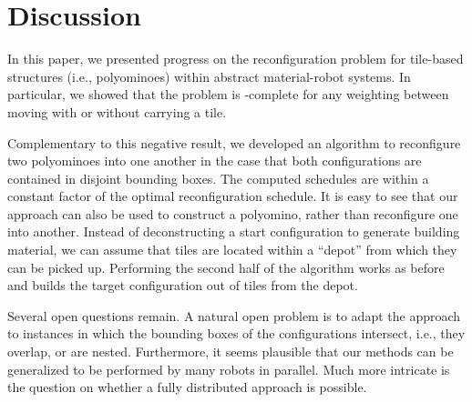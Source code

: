 \section{Discussion}\label{sec:discussion}

In this paper, we presented progress on the reconfiguration problem for tile-based structures (i.e., polyominoes) within abstract material-robot systems.
In particular, we showed that the problem is \NP-complete for any weighting between moving with or without carrying a tile.

Complementary to this negative result, we developed an algorithm to reconfigure two polyominoes into one another in the case that both configurations are contained in disjoint bounding boxes.
The computed schedules are within a constant factor of the optimal reconfiguration schedule.
It is easy to see that our approach can also be used to construct a polyomino, rather than reconfigure one into another.
Instead of deconstructing a start configuration to generate building material, we can assume that tiles are located within a ``depot'' from which they can be picked up.
Performing the second half of the algorithm works as before and builds the target configuration out of tiles from the depot.

Several open questions remain.
A natural open problem is to adapt the approach to instances in which the bounding boxes of the configurations intersect, i.e., they overlap, or are nested.
Furthermore, it seems plausible that our methods can be generalized to be performed by many robots in parallel.
Much more intricate is the question on whether a fully distributed approach is possible.